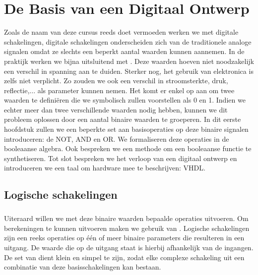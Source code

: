 \chapter{De Basis van een Digitaal Ontwerp}
\label{ch:basis}
\begin{chapterintro}
Zoals de naam van deze cursus reeds doet vermoeden werken we met digitale schakelingen, digitale schakelingen onderscheiden zich van de traditionele analoge signalen omdat ze slechts een beperkt aantal waarden kunnen aannemen. In de praktijk werken we bijna uitsluitend met . Deze waarden hoeven niet noodzakelijk een verschil in spanning aan te duiden. Sterker nog, het gebruik van elektronica is zelfs niet verplicht. Zo zouden we ook een verschil in stroomsterkte, druk, reflectie,... als parameter kunnen nemen. Het komt er enkel op aan om twee waarden te defini\"eren die we symbolisch zullen voorstellen als 0 en 1. Indien we echter meer dan twee verschillende waarden nodig hebben, kunnen we dit probleem oplossen door een aantal binaire waarden te groeperen. In dit eerste hoofdstuk zullen we een beperkte set aan basisoperaties op deze binaire signalen introduceren: de NOT, AND en OR. We formaliseren deze operaties in de booleaanse algebra. Ook bespreken we een methode om een booleaanse functie te synthetiseren. Tot slot bespreken we het verloop van een digitaal ontwerp en introduceren we een taal om hardware mee te beschrijven: VHDL.
\end{chapterintro}
\minitoc[n]
\section{Logische schakelingen}
\paragraph{}
Uiteraard willen we met deze binaire waarden bepaalde operaties uitvoeren. Om berekeningen te kunnen uitvoeren maken we gebruik van . Logische schakelingen zijn een reeks operaties op \'e\'en of meer binaire parameters die resulteren in een uitgang. De waarde die op de uitgang staat is hierbij afhankelijk van de ingangen. De set van  dient klein en simpel te zijn, zodat elke complexe schakeling uit een combinatie van deze basisschakelingen kan bestaan.
